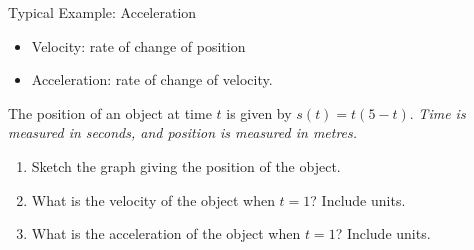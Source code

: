 \begin{frame}[t]{Typical Example: Acceleration}
\begin{itemize}
\item Velocity: rate of change of position\pause
\item Acceleration: rate of change of velocity.
\end{itemize}
\pause
The position of an object at time $t$ is given by $s(t) = t(5-t)$. \textit{Time is measured in seconds, and position is measured in metres.}
\begin{enumerate}
\item Sketch the graph giving the position of the object.
\item What is the velocity of the object when $t=1$? Include units.
\item What is the acceleration of the object when $t=1$? Include units.
\end{enumerate}

\color{answercolor}
\end{frame}
